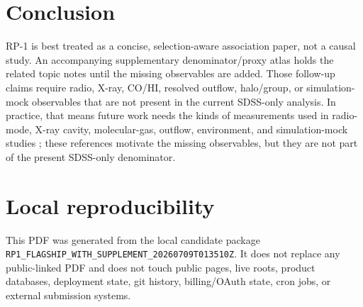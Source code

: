 \documentclass[twocolumn]{aastex631}
\begin{document}
\section{Conclusion}
RP-1 is best treated as a concise, selection-aware association paper, not a causal study. An accompanying supplementary denominator/proxy atlas holds the related topic notes until the missing observables are added. Those follow-up claims require radio, X-ray, CO/HI, resolved outflow, halo/group, or simulation-mock observables that are not present in the current SDSS-only analysis.
In practice, that means future work needs the kinds of measurements used in radio-mode, X-ray cavity, molecular-gas, outflow, environment, and simulation-mock studies \citep{best2005,dekel2006,fabian2012,heckmanbest2014,lamassa2013,mcnamara2007,veilleux2005,xcoldgass2017,xgass2018,cicone2014,carniani2017,fiore2017,simba2019,tng2019,eagle2015,peng2010,piotrowska2022,wetzel2013}; these references motivate the missing observables, but they are not part of the present SDSS-only denominator.

\section{Local reproducibility}
This PDF was generated from the local candidate package \texttt{RP1\_FLAGSHIP\_WITH\_SUPPLEMENT\_20260709T013510Z}. It does not replace any public-linked PDF and does not touch public pages, live roots, product databases, deployment state, git history, billing/OAuth state, cron jobs, or external submission systems.
\end{document}
